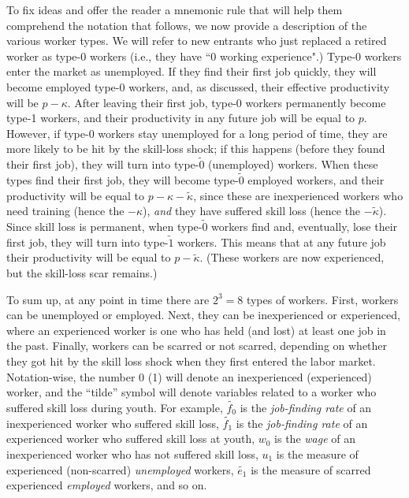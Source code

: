 \documentclass[12pt]{article} %
\theoremstyle{definition}
\begin{document}
To fix ideas and offer the reader a mnemonic rule that will help them comprehend the notation that follows, we now provide a description of the various worker types. We will refer to new entrants who just replaced a retired worker as type-0 workers (i.e., they have ``0 working experience".) 
Type-0 workers enter the market as unemployed. If they find their first job quickly, they will become employed type-0 workers, and, as discussed, their effective productivity will be $p-\kappa$. After leaving their first job, type-0 workers permanently become type-1 workers, and their productivity in any future job will be equal to $p$. However, if type-0 workers stay unemployed for a long period of time, they are more likely to be hit by the skill-loss shock; if this happens (before they found their first job), they will turn into type-$\tilde{0}$ (unemployed) workers. When these types find their first job, they will become type-$\tilde{0}$ employed workers, and their productivity will be equal to $p-\kappa-\tilde{\kappa}$, since these are inexperienced workers who need training (hence the $-{\kappa}$), \textit{and} they have suffered skill loss (hence the $-\tilde{\kappa}$). Since 
skill loss is permanent, when type-$\tilde{0}$ workers find and, eventually, lose their first job, they will turn into type-$\tilde{1}$ workers. This means that at any future job their productivity will be equal to $p-\tilde{\kappa}$. (These workers are now experienced, but the skill-loss scar remains.) %
   
To sum up, at any point in time there are $2^3=8$ types of workers. First, workers can be unemployed or employed. Next, they can be inexperienced or experienced, where an experienced worker is one who has held (and lost) at least one job in the past. Finally, workers can be scarred or not scarred, depending on whether they got hit by the skill loss shock when they first entered the labor market. Notation-wise, the number 0 (1) will denote an inexperienced (experienced) worker, and the ``tilde'' symbol will denote variables related to a worker who suffered skill loss during youth. %
For example, $\tilde{f_0}$ is the \textit{job-finding rate} of an inexperienced worker who suffered skill loss, $\tilde{f_1}$ is the  \textit{job-finding rate} of an experienced worker who suffered skill loss at youth, $w_0$ is the  \textit{wage} of an inexperienced worker who has not suffered skill loss, $u_1$ is the measure of experienced (non-scarred)  \textit{unemployed} workers, $\tilde{e_1}$ is the measure of scarred experienced  \textit{employed} workers, and so on.
\end{document}
